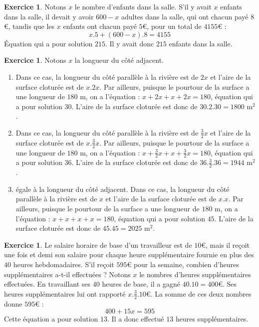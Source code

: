 \documentclass[a4paper,13pt]{scrreprt}
\theoremstyle{plain}
\theoremstyle{definition}
\newtheorem{exo}[subsection]{Exercice}
\begin{document}
\begin{exo}
	Notons $x$ le nombre d'enfants dans la salle. S'il y avait $x$ enfants dans la salle, il devait y avoir $600-x$ adultes dans la salle, qui ont chacun payé $8${\euro}, tandis que les $x$ enfants ont chacun payé $5${\euro}, pour un total de $4155${\euro} :
	$$x.5+(600-x).8=4155$$
	\'Equation qui a pour solution $215$. Il y avait donc $215$ enfants dans la salle.
\end{exo}

\begin{exo}
	Notons $x$ la longueur du côté adjacent.
	\begin{enumerate}
		\item Dans ce cas, la longueur du côté parallèle à la rivière est de $2x$ et l'aire de la surface cloturée est de $x.2x$. Par ailleurs, puisque le pourtour de la surface a une longueur de $180$ m, on a l'équation : $x + 2x + x + 2x = 180$, équation qui a pour solution $30$. L'aire de la surface cloturée est donc de $30.2.30=1800$ m$^{2}$.
		\item Dans ce cas, la longueur du côté parallèle à la rivière est de $\frac{3}{2}x$ et l'aire de la surface cloturée est de $x.\frac{3}{2}x$. Par ailleurs, puisque le pourtour de la surface a une longueur de $180$ m, on a l'équation : $x + \frac{3}{2}x + x + \frac{3}{2}x = 180$, équation qui a pour solution $36$. L'aire de la surface cloturée est donc de $36.\frac{3}{2}.36=1944$ m$^{2}$.
		\item égale à la longueur du côté adjacent. Dans ce cas, la longueur du côté parallèle à la rivière est de $x$ et l'aire de la surface cloturée est de $x.x$. Par ailleurs, puisque le pourtour de la surface a une longueur de $180$ m, on a l'équation : $x + x + x + x = 180$, équation qui a pour solution $45$. L'aire de la surface cloturée est donc de $45.45=2025$ m$^{2}$.
	\end{enumerate}
\end{exo}

\begin{exo}
	Le salaire horaire de base d'un travailleur est de $10${\euro}, mais il reçoit une fois et demi son salaire pour chaque heure supplémentaire fournie en plus des $40$ heures hebdomadaires. S'il reçoit $595${\euro} pour la semaine, combien d'heures supplémentaires a-t-il effectuées ?
	Notons $x$ le nombres d'heures supplémentaires effectuées. En travaillant ses $40$ heures de base, il a gagné $40.10=400${\euro}. Ses heures supplémentaires lui ont rapporté $x.\frac{3}{2}.10${\euro}. La somme de ces deux nombres donne $595${\euro} :
	$$400 + 15x = 595$$
	Cette équation a pour solution $13$. Il a donc effectué $13$ heures supplémentaires.
\end{exo}
\end{document}
